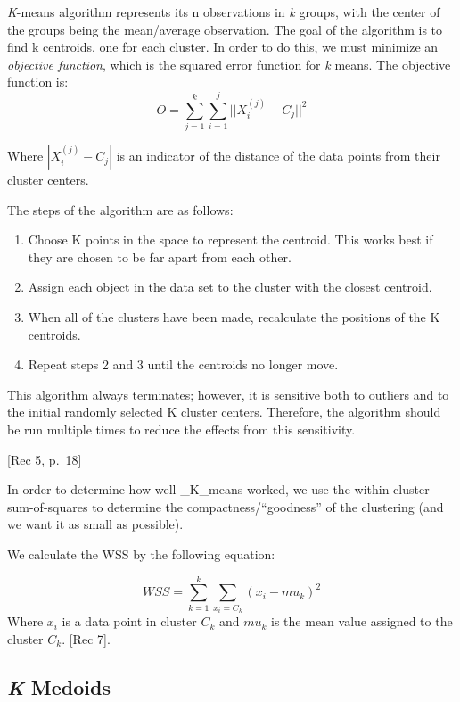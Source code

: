 \documentclass[12pt,twoside]{amherstthesis}
\providecommand{\tightlist}{%
  \setlength{\itemsep}{0pt}\setlength{\parskip}{0pt}}
\begin{document}
  \emph{K}-means algorithm represents its n observations in \emph{k}
  groups, with the center of the groups being the mean/average
  observation. The goal of the algorithm is to find k centroids, one for
  each cluster. In order to do this, we must minimize an \emph{objective
  function}, which is the squared error function for \emph{k} means. The
  objective function is:
  \[O= \sum_{j=1}^k \sum_{i=1}^j ||{{X_i^{(j)}- C_j}}||^2\]
  
  Where \(|{{X_i^{(j)}- C_j}}|\) is an indicator of the distance of the
  data points from their cluster centers.
  
  The steps of the algorithm are as follows:
  
  \begin{enumerate}
  \def\labelenumi{\arabic{enumi}.}
  \tightlist
  \item
    Choose K points in the space to represent the centroid. This works
    best if they are chosen to be far apart from each other.
  \item
    Assign each object in the data set to the cluster with the closest
    centroid.
  \item
    When all of the clusters have been made, recalculate the positions of
    the K centroids.
  \item
    Repeat steps 2 and 3 until the centroids no longer move.
  \end{enumerate}
  
  This algorithm always terminates; however, it is sensitive both to
  outliers and to the initial randomly selected K cluster centers.
  Therefore, the algorithm should be run multiple times to reduce the
  effects from this sensitivity.
  
  {[}Rec 5, p.~18{]}
  
  In order to determine how well \_K\_means worked, we use the within
  cluster sum-of-squares to determine the compactness/``goodness'' of the
  clustering (and we want it as small as possible).
  
  We calculate the WSS by the following equation:
  
  \[WSS = \sum_{k=1}^k \sum_{x_i=C_k} ({{x_i- mu_k}})^2\] Where \(x_i\) is
  a data point in cluster \(C_k\) and \(mu_k\) is the mean value assigned
  to the cluster \(C_k\). {[}Rec 7{]}.
  
  \subsection{\texorpdfstring{\emph{K}
  Medoids}{K Medoids}}\label{k-medoids}
  
\end{document}
